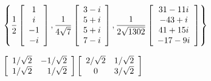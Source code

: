 \begin{enumerate}[!HW!, start=1]
\begin{multicols}{2}
\itemspade %
$\left\{\dfrac{1}{2}\mtx{c}{1\\i\\-1\\-i}, \dfrac{1}{4\sqrt{7}}\mtx{c}{3-i\\5+i\\5+i\\7-i}, \dfrac{1}{2\sqrt{1302}}\mtx{c}{31-11i\\-43+i\\41+15i\\-17-9i}\right\}$ %
\end{multicols}
\begin{multicols}{2}
\itemspade $\mtx{rr}{1/\sqrt{2} & -1/\sqrt{2}  \\ 1/\sqrt{2} &1/\sqrt{2} }\mtx{cc}{2/\sqrt{2} & 1/\sqrt{2} \\ 0 & 3/\sqrt{2} }$ %

\end{multicols}
\end{enumerate}
